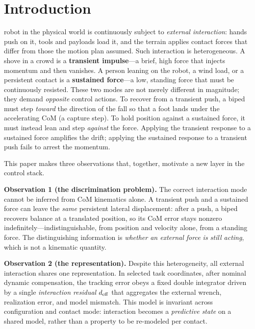 \documentclass[journal]{IEEEtran}
\begin{document}
\section{Introduction}
\label{sec:intro}

 robot in the physical world is continuously subject to \emph{external interaction}: hands push on it, tools and payloads load it, and the terrain applies contact forces that differ from those the motion plan assumed. Such interaction is heterogeneous. A shove in a crowd is a \textbf{transient impulse}---a brief, high force that injects momentum and then vanishes. A person leaning on the robot, a wind load, or a persistent contact is a \textbf{sustained force}---a low, standing force that must be continuously resisted. These two modes are not merely different in magnitude; they demand \emph{opposite} control actions. To recover from a transient push, a biped must step \emph{toward} the direction of the fall so that a foot lands under the accelerating CoM (a capture step). To hold position against a sustained force, it must instead lean and step \emph{against} the force. Applying the transient response to a sustained force amplifies the drift; applying the sustained response to a transient push fails to arrest the momentum.

This paper makes three observations that, together, motivate a new layer in the control stack.

\textbf{Observation 1 (the discrimination problem).} The correct interaction mode cannot be inferred from CoM kinematics alone. A transient push and a sustained force can leave the \emph{same} persistent lateral displacement: after a push, a biped recovers balance at a translated position, so its CoM error stays nonzero indefinitely---indistinguishable, from position and velocity alone, from a standing force. The distinguishing information is \emph{whether an external force is still acting}, which is not a kinematic quantity.

\textbf{Observation 2 (the representation).} Despite this heterogeneity, all external interaction shares one representation. In selected task coordinates, after nominal dynamic compensation, the tracking error obeys a fixed double integrator driven by a single \emph{interaction residual} $d_{\rm eff}$ that aggregates the external wrench, realization error, and model mismatch. This model is invariant across configuration and contact mode: interaction becomes a \emph{predictive state} on a shared model, rather than a property to be re-modeled per contact.
\end{document}
